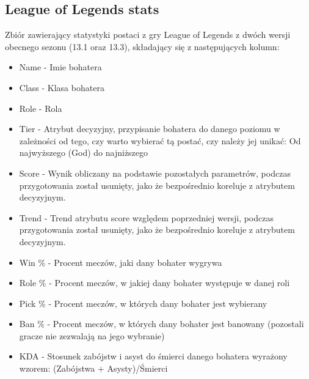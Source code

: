 \documentclass{book}
\begin{document}
\subsection{League of Legends stats}
Zbiór zawierający statystyki postaci z gry League of Legends z 
dwóch wersji obecnego sezonu (13.1 oraz 13.3), składający się z 
następujących kolumn:
\begin{itemize}
    \item Name - Imie bohatera
    \item Class - Klasa bohatera
    \item Role - Rola
    \item Tier - Atrybut decyzyjny, 
    przypisanie bohatera do danego 
    poziomu w zależności od tego, 
    czy warto wybierać tą postać, 
    czy należy jej unikać: 
    Od najwyższego (God) do najniższego 
    \item Score - Wynik obliczany na podstawie 
    pozostałych parametrów, 
    podczas przygotowania został 
    usunięty, jako że bezpośrednio 
    koreluje z atrybutem decyzyjnym.
    \item Trend - Trend atrybutu score względem 
    poprzedniej wersji, 
    podczas przygotowania został 
    usunięty, jako że bezpośrednio 
    koreluje z atrybutem decyzyjnym.
    \item Win \% - Procent meczów, 
    jaki dany bohater wygrywa
    \item Role \% - Procent meczów, 
    w jakiej dany bohater występuje w danej roli
    \item Pick \% - Procent meczów, 
    w których dany bohater jest wybierany
    \item Ban \% - Procent meczów, 
    w których dany bohater jest banowany (pozostali gracze nie zezwalają na jego wybranie)
    \item KDA - Stosunek zabójstw 
    i asyst do śmierci danego 
    bohatera wyrażony wzorem: 
    (Zabójstwa + Asysty)/Śmierci
\end{itemize}
\end{document}
